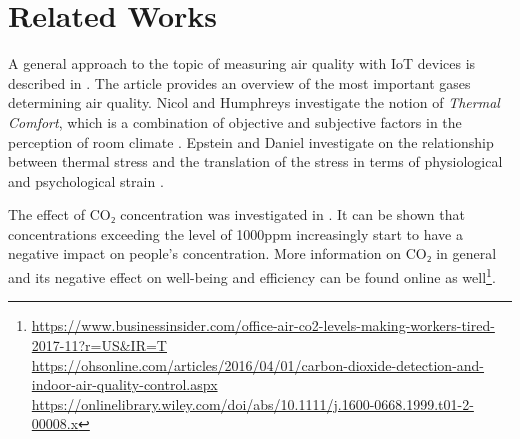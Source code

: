 \section{Related Works}
A general approach to the topic of measuring air quality with IoT devices is described in \cite{air_quality}. The article provides an overview of the most important gases determining air quality.  Nicol and Humphreys investigate the notion of \textit{Thermal Comfort}, which is a combination of objective and subjective factors in the perception of room climate \cite{nicol2002adaptive}. Epstein and Daniel investigate on the relationship between thermal stress and the translation of the stress in terms of physiological and psychological strain \cite{epstein2006thermal}.

The effect of CO₂ concentration was investigated in \cite{indoor_pollutant}. It can be shown that concentrations exceeding the level of 1000ppm increasingly start to have a negative impact on people's concentration. More information on CO₂ in general and its negative effect on well-being and efficiency can be found online as well\footnote{ \url{https://www.businessinsider.com/office-air-co2-levels-making-workers-tired-2017-11?r=US&IR=T}\\ 
\url{https://ohsonline.com/articles/2016/04/01/carbon-dioxide-detection-and-indoor-air-quality-control.aspx} \\ 
\url{https://onlinelibrary.wiley.com/doi/abs/10.1111/j.1600-0668.1999.t01-2-00008.x}}.
